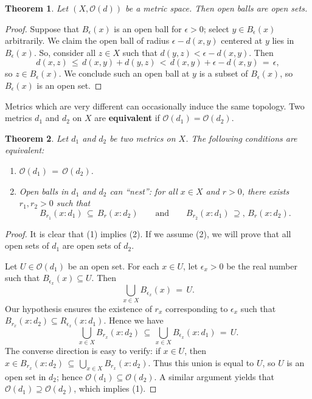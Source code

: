 \documentclass[11pt]{article}
\newtheorem{theorem}{Theorem}
\renewcommand{\O}{\mathcal{O}}
\begin{document}
\begin{adjustwidth}{0.5cm}{}
  \begin{theorem}
    Let $(X, \O(d))$ be a metric space. Then open balls are open sets.
  \end{theorem}
  \begin{proof}
    Suppose that $B_{\epsilon}(x)$ is an open ball for $\epsilon > 0$; select $y \in B_{\epsilon}(x)$ arbitrarily. We claim the open ball of radius $\epsilon - d(x, y)$ centered at $y$ lies in $B_{\epsilon}(x)$. So, consider all $z \in X$ such that $d(y, z) < \epsilon - d(x, y)$. Then
    \[
      d(x, z) \, \le \, d(x, y) + d(y, z) \, < \, d(x, y) + \epsilon - d(x, y) \, = \, \epsilon,
    \]
    so $z \in B_{\epsilon}(x)$. We conclude such an open ball at $y$ is a subset of $B_{\epsilon}(x)$, so $B_{\epsilon}(x)$ is an open set.
  \end{proof}
\end{adjustwidth}

Metrics which are very different can occasionally induce the same topology. Two metrics $d_{1}$ and $d_{2}$ on $X$ are \textbf{equivalent} if $\O(d_{1}) = \O(d_{2})$.

\begin{adjustwidth}{0.5cm}{}
  \begin{theorem}
    Let $d_{1}$ and $d_{2}$ be two metrics on $X$. The following conditions are equivalent:
    \begin{enumerate}
      \item $\O(d_{1}) \, = \, \O(d_{2})$.
      \item Open balls in $d_{1}$ and $d_{2}$ can ``nest'': for all $x \in X$ and $r > 0$, there exists $r_{1}, r_{2} > 0$ such that
      \[
        B_{r_{1}}(x : d_{1}) \, \subseteq \, B_{r}(x : d_{2}) \qquad \text{and} \qquad B_{r_{2}}(x : d_{1}) \, \supseteq, \, B_{r}(x : d_{2}).
      \]
    \end{enumerate}
  \end{theorem}
  \newpage
  \begin{proof}
    It is clear that (1) implies (2). If we assume (2), we will prove that all open sets of $d_{1}$ are open sets of $d_{2}$.

    Let $U \in \O(d_{1})$ be an open set. For each $x \in U$, let $\epsilon_{x} > 0$ be the real number such that $B_{\epsilon_{x}}(x) \subseteq U$. Then
    \[
      \bigcup\limits_{x \in X} B_{\epsilon_{x}}(x) \, = \, U.
    \]
    Our hypothesis ensures the existence of $r_{x}$ corresponding to $\epsilon_{x}$ such that $B_{r_{x}}(x : d_{2}) \subseteq R_{\epsilon_{x}}(x : d_{1})$. Hence we have
    \[
      \bigcup\limits_{x \in X} B_{r_{x}}(x : d_{2}) \, \subseteq \, \bigcup\limits_{x \in X} B_{\epsilon_{x}}(x : d_{1}) \, = \, U.
    \]
    The converse direction is easy to verify: if $x \in U$, then $x \in B_{r_{x}}(x : d_{2}) \, \subseteq \, \bigcup_{x \in X} B_{r_{x}}(x : d_{2})$. Thus this union is equal to $U$, so $U$ is an open set in $d_{2}$; hence $\O(d_{1}) \subseteq \O(d_{2})$. A similar argument yields that $\O(d_{1}) \supseteq \O(d_{2})$, which implies (1).
  \end{proof}
\end{adjustwidth}
\end{document}
